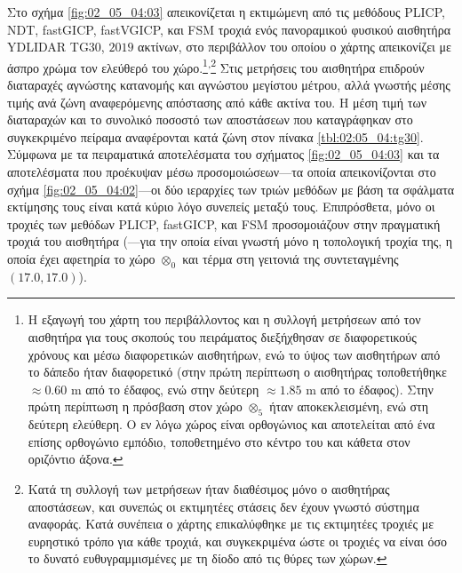 Στο σχήμα \ref{fig:02_05_04:03} απεικονίζεται η εκτιμώμενη από τις μεθόδους
PLICP, NDT, fastGICP, fastVGICP, και FSM τροχιά ενός πανοραμικού φυσικού
αισθητήρα YDLIDAR TG30, $2019$ ακτίνων, στο περιβάλλον του οποίου ο χάρτης
απεικονίζει με άσπρο χρώμα τον ελεύθερό του χώρο.\footnote{Η εξαγωγή του χάρτη
του περιβάλλοντος και η συλλογή μετρήσεων από τον αισθητήρα για τους σκοπούς
του πειράματος διεξήχθησαν σε διαφορετικούς χρόνους και μέσω διαφορετικών
αισθητήρων, ενώ το ύψος των αισθητήρων από το δάπεδο ήταν διαφορετικό (στην
πρώτη περίπτωση ο αισθητήρας τοποθετήθηκε $\approx 0.60$ m από το έδαφος, ενώ
στην δεύτερη $\approx 1.85$ m από το έδαφος). Στην πρώτη περίπτωση η πρόσβαση
στον χώρο $\otimes_5$ ήταν αποκεκλεισμένη, ενώ στη δεύτερη ελεύθερη.  Ο εν λόγω
χώρος είναι ορθογώνιος και αποτελείται από ένα επίσης ορθογώνιο εμπόδιο,
τοποθετημένο στο κέντρο του και κάθετα στον οριζόντιο
άξονα.}\textsuperscript{,}\footnote{Κατά τη συλλογή των μετρήσεων ήταν
διαθέσιμος μόνο ο αισθητήρας αποστάσεων, και συνεπώς οι εκτιμητέες στάσεις δεν
έχουν γνωστό σύστημα αναφοράς. Κατά συνέπεια ο χάρτης επικαλύφθηκε με τις
εκτιμητέες τροχιές με ευρηστικό τρόπο για κάθε τροχιά, και συγκεκριμένα ώστε οι
τροχιές να είναι όσο το δυνατό ευθυγραμμισμένες με τη δίοδο από τις θύρες των
χώρων.} Στις μετρήσεις του αισθητήρα επιδρούν διαταραχές αγνώστης κατανομής και
αγνώστου μεγίστου μέτρου, αλλά γνωστής μέσης τιμής ανά ζώνη αναφερόμενης
απόστασης από κάθε ακτίνα του. Η μέση τιμή των διαταραχών και το συνολικό
ποσοστό των αποστάσεων που καταγράφηκαν στο συγκεκριμένο πείραμα αναφέρονται
κατά ζώνη στον πίνακα \ref{tbl:02:05_04:tg30}.  Σύμφωνα με τα πειραματικά
αποτελέσματα του σχήματος \ref{fig:02_05_04:03} και τα αποτελέσματα που
προέκυψαν μέσω προσομοιώσεων---τα οποία απεικονίζονται στο σχήμα
\ref{fig:02_05_04:02}---οι δύο ιεραρχίες των τριών μεθόδων με βάση τα σφάλματα
εκτίμησης τους είναι κατά κύριο λόγο συνεπείς μεταξύ τους.  Επιπρόσθετα, μόνο
οι τροχιές των μεθόδων PLICP, fastGICP, και FSM προσομοιάζουν στην πραγματική
τροχιά του αισθητήρα (---για την οποία είναι γνωστή μόνο η τοπολογική τροχία
της, η οποία έχει αφετηρία το χώρο $\otimes_0$ και τέρμα στη γειτονιά της
συντεταγμένης $(17.0, 17.0)$).


